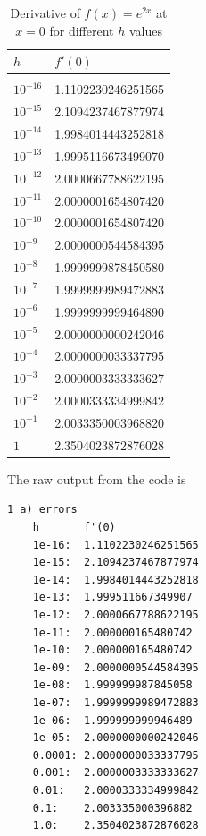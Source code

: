 \documentclass{article}
\begin{document}
\begin{enumerate}
\begin{enumerate}
    \begin{table}[h]
        \centering
        \begin{tabular}{l l}
            $h$ & $f'(0)$\\ [0.2 em] \hline  \\[-0.8em]
            $10^{-16}$ & 1.1102230246251565 \\
            $10^{-15}$ & 2.1094237467877974 \\
            $10^{-14}$ & 1.9984014443252818 \\
            $10^{-13}$ & 1.9995116673499070 \\
            $10^{-12}$ & 2.0000667788622195 \\
            $10^{-11}$ & 2.0000001654807420 \\
            $10^{-10}$ & 2.0000001654807420 \\  
            $10^{-9}$ & 2.0000000544584395 \\
            $10^{-8}$ & 1.9999999878450580 \\
            $10^{-7}$ & 1.9999999989472883 \\
            $10^{-6}$ & 1.9999999999464890 \\
            $10^{-5}$ & 2.0000000000242046 \\
            $10^{-4}$ & 2.0000000033337795\\
            $10^{-3}$ & 2.0000003333333627\\
            $10^{-2}$ & 2.0000333334999842\\
            $10^{-1}$ & 2.0033350003968820\\
            $1$ & 2.3504023872876028\\
        \end{tabular}
        \caption{Derivative of $f(x)=e^{2x}$ at $x=0$ for different $h$ values}
        \label{tab:1a}
    \end{table}

    The raw output from the code is 
    \begin{verbatim}
1 a) errors
    h       f'(0)
    1e-16:	1.1102230246251565
    1e-15:	2.1094237467877974
    1e-14:	1.9984014443252818
    1e-13:	1.999511667349907
    1e-12:	2.0000667788622195
    1e-11:	2.000000165480742
    1e-10:	2.000000165480742
    1e-09:	2.0000000544584395
    1e-08:	1.999999987845058
    1e-07:	1.9999999989472883
    1e-06:	1.999999999946489
    1e-05:	2.0000000000242046
    0.0001:	2.0000000033337795
    0.001:	2.0000003333333627
    0.01:	2.0000333334999842
    0.1:	2.003335000396882
    1.0:	2.3504023872876028
    \end{verbatim}


\end{enumerate}
\end{enumerate}
\end{document}
